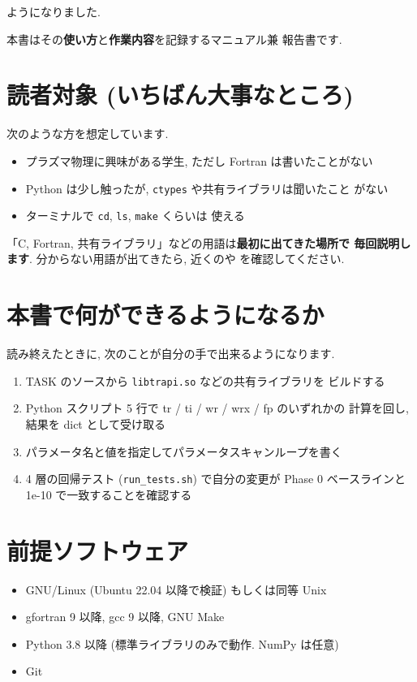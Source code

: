 \documentclass[11pt,a4paper]{report}
\begin{document}
ようになりました.

本書はその\textbf{使い方}と\textbf{作業内容}を記録するマニュアル兼
報告書です.

\section{読者対象 (いちばん大事なところ)}

次のような方を想定しています.

\begin{itemize}[leftmargin=1.5em]
  \item プラズマ物理に興味がある学生, ただし Fortran は書いたことがない
  \item Python は少し触ったが, \texttt{ctypes} や共有ライブラリは聞いたこと
        がない
  \item ターミナルで \texttt{cd}, \texttt{ls}, \texttt{make} くらいは
        使える
\end{itemize}

「C, Fortran, 共有ライブラリ」などの用語は\textbf{最初に出てきた場所で
毎回説明します}. 分からない用語が出てきたら, 近くのや
 を確認してください.

\section{本書で何ができるようになるか}

読み終えたときに, 次のことが自分の手で出来るようになります.

\begin{enumerate}[leftmargin=1.5em]
  \item TASK のソースから \texttt{libtrapi.so} などの共有ライブラリを
        ビルドする
  \item Python スクリプト 5 行で tr / ti / wr / wrx / fp のいずれかの
        計算を回し, 結果を dict として受け取る
  \item パラメータ名と値を指定してパラメータスキャンループを書く
  \item 4 層の回帰テスト (\texttt{run\_tests.sh}) で自分の変更が
        Phase 0 ベースラインと 1e-10 で一致することを確認する
\end{enumerate}

\section{前提ソフトウェア}

\begin{itemize}[leftmargin=1.5em]
  \item GNU/Linux (Ubuntu 22.04 以降で検証) もしくは同等 Unix
  \item gfortran 9 以降, gcc 9 以降, GNU Make
  \item Python 3.8 以降 (標準ライブラリのみで動作. NumPy は任意)
  \item Git
\end{itemize}
\end{document}
